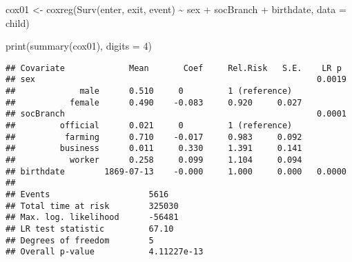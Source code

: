 \documentclass[
]{book}
\newenvironment{Shaded}{\begin{snugshade}}{\end{snugshade}}
\newcommand{\AttributeTok}[1]{\textcolor[rgb]{0.77,0.63,0.00}{#1}}
\newcommand{\CommentTok}[1]{\textcolor[rgb]{0.56,0.35,0.01}{\textit{#1}}}
\newcommand{\DecValTok}[1]{\textcolor[rgb]{0.00,0.00,0.81}{#1}}
\newcommand{\FunctionTok}[1]{\textcolor[rgb]{0.00,0.00,0.00}{#1}}
\newcommand{\NormalTok}[1]{#1}
\newcommand{\OtherTok}[1]{\textcolor[rgb]{0.56,0.35,0.01}{#1}}
\newcommand{\SpecialCharTok}[1]{\textcolor[rgb]{0.00,0.00,0.00}{#1}}
\begin{document}
\begin{Shaded}
\begin{Highlighting}[]
\NormalTok{cox01 }\OtherTok{\textless{}{-}} \FunctionTok{coxreg}\NormalTok{(}\FunctionTok{Surv}\NormalTok{(enter, exit, event) }\SpecialCharTok{\textasciitilde{}}\NormalTok{ sex }\SpecialCharTok{+}\NormalTok{ socBranch }\SpecialCharTok{+}\NormalTok{ birthdate, }
              \AttributeTok{data =}\NormalTok{ child)}

\FunctionTok{print}\NormalTok{(}\FunctionTok{summary}\NormalTok{(cox01), }\AttributeTok{digits =} \DecValTok{4}\NormalTok{)}
\end{Highlighting}
\end{Shaded}

\begin{verbatim}
## Covariate             Mean       Coef     Rel.Risk   S.E.    LR p
## sex                                                         0.0019 
##             male      0.510     0         1 (reference)
##           female      0.490    -0.083     0.920     0.027
## socBranch                                                   0.0001 
##         official      0.021     0         1 (reference)
##          farming      0.710    -0.017     0.983     0.092
##         business      0.011     0.330     1.391     0.141
##           worker      0.258     0.099     1.104     0.094
## birthdate        1869-07-13    -0.000     1.000     0.000   0.0000 
## 
## Events                    5616 
## Total time at risk        325030 
## Max. log. likelihood      -56481 
## LR test statistic         67.10 
## Degrees of freedom        5 
## Overall p-value           4.11227e-13
\end{verbatim}

\begin{Shaded}
\end{Shaded}
\end{document}
